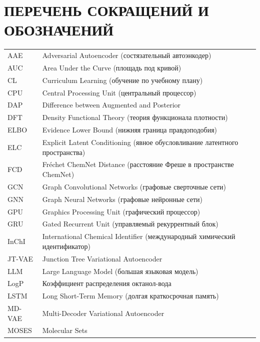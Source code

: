 \documentclass[../main.tex]{subfiles}
\begin{document}
\onlyinsubfile{
    \renewcommand{\contentsname}{ОГЛАВЛЕНИЕ}
    \setcounter{tocdepth}{3}
    \tableofcontents
}

\chapter*{\MakeUppercase{Перечень сокращений и обозначений}}

\begin{longtable}{p{}p{}}

AAE & Adversarial Autoencoder (состязательный автоэнкодер) \\
AUC & Area Under the Curve (площадь под кривой) \\
CL & Curriculum Learning (обучение по учебному плану) \\
CPU & Central Processing Unit (центральный процессор) \\
DAP & Difference between Augmented and Posterior \\
DFT & Density Functional Theory (теория функционала плотности) \\
ELBO & Evidence Lower Bound (нижняя граница правдоподобия) \\
ELC & Explicit Latent Conditioning (явное обусловливание латентного пространства) \\
FCD & Fréchet ChemNet Distance (расстояние Фреше в пространстве ChemNet) \\
GCN & Graph Convolutional Networks (графовые сверточные сети) \\
GNN & Graph Neural Networks (графовые нейронные сети) \\
GPU & Graphics Processing Unit (графический процессор) \\
GRU & Gated Recurrent Unit (управляемый рекуррентный блок) \\
InChI & International Chemical Identifier (международный химический идентификатор) \\
JT-VAE & Junction Tree Variational Autoencoder \\
LLM & Large Language Model (большая языковая модель) \\
LogP & Коэффициент распределения октанол-вода \\
LSTM & Long Short-Term Memory (долгая краткосрочная память) \\
MD-VAE & Multi-Decoder Variational Autoencoder \\
MOSES & Molecular Sets \\

\end{longtable}
\end{document}
